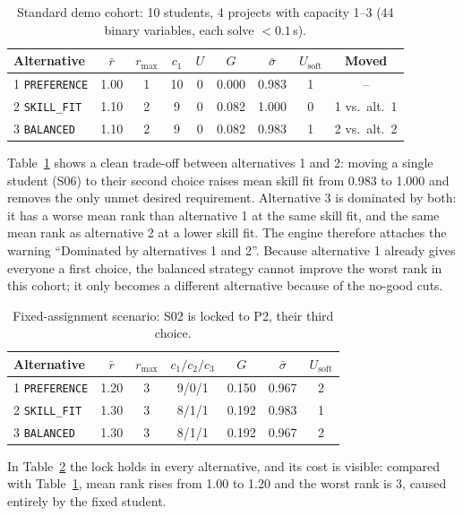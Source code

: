 \documentclass[11pt,a4paper]{article}
\newcommand{\code}[1]{\texttt{#1}}
\begin{document}
\begin{table}[!htbp]
\centering
\caption{Standard demo cohort: 10 students, 4 projects with capacity 1--3
         (44 binary variables, each solve $< 0.1$\,s).}
\label{tab:std}
\begin{tabular}{lcccccccc}
\toprule
Alternative & $\bar r$ & $r_{\max}$ & $c_1$ & $U$ & $G$ & $\bar\sigma$ & $U_{\text{soft}}$ & Moved\\
\midrule
1 \code{PREFERENCE} & 1.00 & 1 & 10 & 0 & 0.000 & 0.983 & 1 & --\\
2 \code{SKILL\_FIT}  & 1.10 & 2 &  9 & 0 & 0.082 & 1.000 & 0 & 1 vs.\ alt.~1\\
3 \code{BALANCED}   & 1.10 & 2 &  9 & 0 & 0.082 & 0.983 & 1 & 2 vs.\ alt.~2\\
\bottomrule
\end{tabular}
\end{table}

Table~\ref{tab:std} shows a clean trade-off between alternatives 1 and 2:
moving a single student (S06) to their second choice raises mean skill fit
from 0.983 to 1.000 and removes the only unmet desired requirement. Alternative
3 is dominated by both: it has a worse mean rank than alternative 1 at the same
skill fit, and the same mean rank as alternative 2 at a lower skill fit. The
engine therefore attaches the warning ``Dominated by alternatives 1 and 2''. Because alternative 1 already gives everyone a
first choice, the balanced strategy cannot improve the worst rank in this
cohort; it only becomes a different alternative because of the no-good cuts.

\begin{table}[!htbp]
\centering
\caption{Fixed-assignment scenario: S02 is locked to P2, their third choice.}
\label{tab:fixed}
\begin{tabular}{lcccccc}
\toprule
Alternative & $\bar r$ & $r_{\max}$ & $c_1/c_2/c_3$ & $G$ & $\bar\sigma$ & $U_{\text{soft}}$\\
\midrule
1 \code{PREFERENCE} & 1.20 & 3 & 9/0/1 & 0.150 & 0.967 & 2\\
2 \code{SKILL\_FIT}  & 1.30 & 3 & 8/1/1 & 0.192 & 0.983 & 1\\
3 \code{BALANCED}   & 1.30 & 3 & 8/1/1 & 0.192 & 0.967 & 2\\
\bottomrule
\end{tabular}
\end{table}

In Table~\ref{tab:fixed} the lock holds in every alternative, and its cost is
visible: compared with Table~\ref{tab:std}, mean rank rises from 1.00 to 1.20
and the worst rank is 3, caused entirely by the fixed student.
\end{document}
